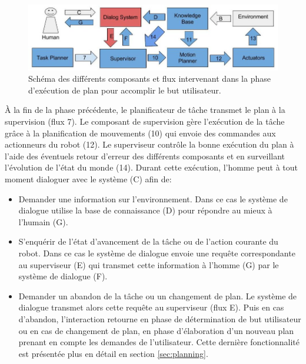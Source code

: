\documentclass[a4paper,11pt,twoside]{StyleThese}
\begin{document}
\begin{figure}[ht!]
 \centering
  \includegraphics[width=0.99\linewidth]{./img/phase3color.jpg} 
  \caption {Schéma des différents composants et flux intervenant dans la phase d'exécution de plan pour accomplir le but utilisateur.}
  \label{fig:phase3}
\end{figure}

À la fin de la phase précédente, le planificateur de tâche transmet le plan à la supervision (flux 7). Le composant de supervision gère l'exécution de la tâche grâce à la planification de mouvements (10) qui envoie des commandes aux actionneurs du robot (12). Le superviseur contrôle la bonne exécution du plan à l'aide des éventuels retour d'erreur des différents composants et en surveillant l'évolution de l'état du monde (14). Durant cette exécution, l'homme peut à tout moment dialoguer avec le système (C) afin de:
\begin{itemize}
\item Demander une information sur l'environnement. Dans ce cas le système de dialogue utilise la base de connaissance (D) pour répondre au mieux à l'humain (G).
\item S'enquérir de l'état d'avancement de la tâche ou de l'action courante du robot. Dans ce cas le système de dialogue envoie une requête correspondante au superviseur (E) qui transmet cette information à l'homme (G) par le système de dialogue (F).
\item Demander un abandon de la tâche ou un changement de plan. Le système de dialogue transmet alors cette requête au superviseur (flux E). Puis en cas d'abandon, l'interaction retourne en phase de détermination de but utilisateur ou en cas de changement de plan, en phase d'élaboration d'un nouveau plan prenant en compte les demandes de l'utilisateur. Cette dernière fonctionnalité est présentée plus en détail en section \ref{sec:planning}.
\end{itemize}
\end{document}
